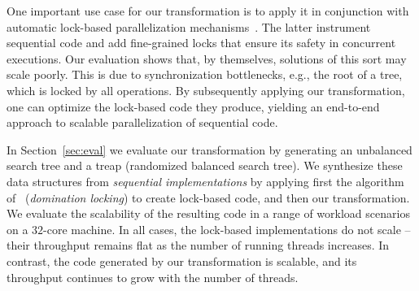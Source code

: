 One important use case for our transformation is to apply it in conjunction with automatic lock-based
parallelization mechanisms~\cite{Gueta2011,MZGB:POPL06}.
The latter instrument sequential code 
and add fine-grained locks
that ensure its safety in concurrent executions.
Our evaluation shows that, by themselves, solutions of this sort may scale poorly.
This is due to synchronization bottlenecks, e.g., the root of a tree,
which is locked by all operations.
By subsequently applying our transformation, one can optimize
the lock-based code they produce, yielding an end-to-end approach to
scalable parallelization of sequential code.


In Section~\ref{sec:eval} we evaluate our transformation by generating an unbalanced search tree and a treap
(randomized balanced search tree).
We synthesize these data structures from \emph{sequential implementations} by applying first the algorithm of~\cite{Gueta2011} (\emph{domination locking}) to create lock-based code, and then our transformation.
We evaluate the scalability of the resulting code
in a range of workload scenarios on a $32$-core machine.
In all cases, the lock-based implementations do not scale --
their throughput remains flat as the number of running threads increases. In contrast, the code generated by our transformation
is scalable, and its throughput continues to grow with the number of threads.

